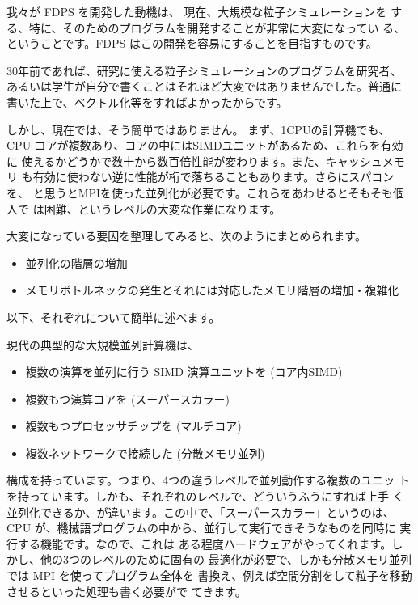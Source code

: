 我々が FDPS を開発した動機は、
現在、大規模な粒子シミュレーションを
する、特に、そのためのプログラムを開発することが非常に大変になってい
る、ということです。FDPS はこの開発を容易にすることを目指すものです。

30年前であれば、研究に使える粒子シミュレーションのプログラムを研究者、
あるいは学生が自分で書くことはそれほど大変ではありませんでした。普通に
書いた上で、ベクトル化等をすればよかったからです。

しかし、現在では、そう簡単ではありません。
まず、1CPUの計算機でも、
CPU コアが複数あり、コアの中にはSIMDユニットがあるため、これらを有効に
使えるかどうかで数十から数百倍性能が変わります。また、キャッシュメモリ
も有効に使わない逆に性能が桁で落ちることもあります。さらにスパコンを、
と思うとMPIを使った並列化が必要です。これらをあわせるとそもそも個人で
は困難、というレベルの大変な作業になります。

大変になっている要因を整理してみると、次のようにまとめられます。

\begin{itemize}

\item 並列化の階層の増加

\item メモリボトルネックの発生とそれには対応したメモリ階層の増加・複雑化

  
\end{itemize}  

以下、それぞれについて簡単に述べます。

現代の典型的な大規模並列計算機は、

\begin{itemize}

\item 複数の演算を並列に行う SIMD 演算ユニットを (コア内SIMD)
\item 複数もつ演算コアを (スーパースカラー)
\item 複数もつプロセッサチップを (マルチコア)
\item 複数ネットワークで接続した (分散メモリ並列)

\end{itemize}  
構成を持っています。つまり、4つの違うレベルで並列動作する複数のユニッ
トを持っています。しかも、それぞれのレベルで、どういうふうにすれば上手
く並列化できるか、が違います。この中で、「スーパースカラー」というのは、
CPU が、機械語プログラムの中から、並行して実行できそうなものを同時に
実行する機能です。なので、これは
ある程度ハードウェアがやってくれます。しかし、他の3つのレベルのために固有の
最適化が必要で、しかも分散メモリ並列では MPI を使ってプログラム全体を
書換え、例えば空間分割をして粒子を移動させるといった処理も書く必要がで
てきます。

